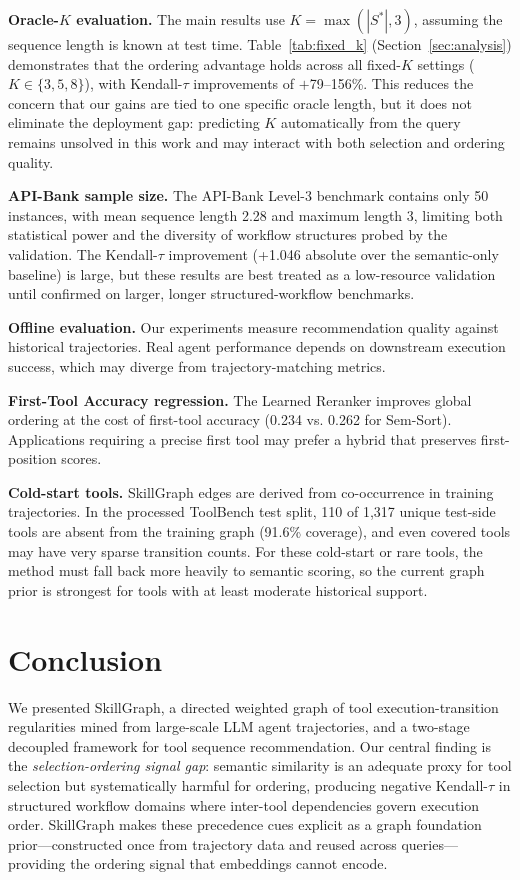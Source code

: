 \documentclass[lettersize,journal]{IEEEtran}
\begin{document}
\textbf{Oracle-$K$ evaluation.}
The main results use $K = \max(|S^*|, 3)$, assuming the sequence length is known at test time.
Table~\ref{tab:fixed_k} (Section~\ref{sec:analysis}) demonstrates that the ordering advantage holds across all fixed-$K$ settings ($K \in \{3,5,8\}$), with Kendall-$\tau$ improvements of $+$79--156\%.
This reduces the concern that our gains are tied to one specific oracle length, but it does not eliminate the deployment gap: predicting $K$ automatically from the query remains unsolved in this work and may interact with both selection and ordering quality.

\textbf{API-Bank sample size.}
The API-Bank Level-3 benchmark contains only 50 instances, with mean sequence length 2.28 and maximum length 3, limiting both statistical power and the diversity of workflow structures probed by the validation.
The Kendall-$\tau$ improvement (+1.046 absolute over the semantic-only baseline) is large, but these results are best treated as a low-resource validation until confirmed on larger, longer structured-workflow benchmarks.

\textbf{Offline evaluation.}
Our experiments measure recommendation quality against historical trajectories.
Real agent performance depends on downstream execution success, which may diverge from trajectory-matching metrics.

\textbf{First-Tool Accuracy regression.}
The Learned Reranker improves global ordering at the cost of first-tool accuracy (0.234 vs. 0.262 for Sem-Sort).
Applications requiring a precise first tool may prefer a hybrid that preserves first-position scores.

\textbf{Cold-start tools.}
SkillGraph edges are derived from co-occurrence in training trajectories.
In the processed ToolBench test split, 110 of 1,317 unique test-side tools are absent from the training graph (91.6\% coverage), and even covered tools may have very sparse transition counts.
For these cold-start or rare tools, the method must fall back more heavily to semantic scoring, so the current graph prior is strongest for tools with at least moderate historical support.


\section{Conclusion}
\label{sec:conclusion}

We presented SkillGraph, a directed weighted graph of tool execution-transition regularities mined from large-scale LLM agent trajectories, and a two-stage decoupled framework for tool sequence recommendation.
Our central finding is the \emph{selection-ordering signal gap}: semantic similarity is an adequate proxy for tool selection but systematically harmful for ordering, producing negative Kendall-$\tau$ in structured workflow domains where inter-tool dependencies govern execution order.
SkillGraph makes these precedence cues explicit as a graph foundation prior---constructed once from trajectory data and reused across queries---providing the ordering signal that embeddings cannot encode.
\end{document}

